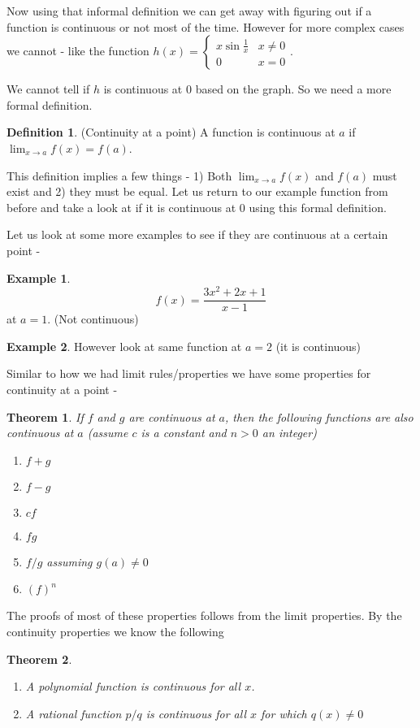 \documentclass[12pt,reqno]{article}
\newtheorem{Theorem}{Theorem}
\theoremstyle{definition}
\newtheorem*{Definition}{Definition}
\newtheorem*{Example}{Example}
\begin{document}
Now using that informal definition we can get away with figuring out if a function is continuous or not most of the time. However for more complex cases we cannot - like the function $h(x) = \begin{cases}
	x \sin \frac{1}{x} & x \neq 0 \\ 0 & x = 0
\end{cases}$. 

We cannot tell if $h$ is continuous at $0$ based on the graph. So we need a more formal definition. 

\begin{Definition}
	(Continuity at a point) A function is continuous at $a$ if $\lim_{x \to a} f(x) = f(a)$. 
\end{Definition}

This definition implies a few things - 1) Both $\lim_{x\to a}f(x)$ and $f(a)$ must exist and 2) they must be equal. Let us return to our example function from before and take a look at if it is continuous at $0$ using this formal definition. 

Let us look at some more examples to see if they are continuous at a certain point - 
\begin{Example}
	$$f(x) = \frac{3x^2 + 2x+ 1}{x - 1}$$ at $a = 1$. (Not continuous)
\end{Example}
\begin{Example}
	However look at same function at $a = 2$ (it is continuous)
\end{Example}

Similar to how we had limit rules/properties we have some properties for continuity at a point - 
\begin{Theorem}
	If $f$ and $g$ are continuous at $a$, then the following functions are also continuous at $a$ (assume $c$ is a constant and $n > 0$ an integer)
	\begin{enumerate}
		\item[a.] $f + g$
		\item[b.] $f - g$
		\item[c.] $c f$ 
		\item[d.] $f g$ 
		\item[e.] $f/g$ assuming $g(a) \neq 0$
		\item[f.] $(f)^n$ 
	\end{enumerate}
\end{Theorem}

The proofs of most of these properties follows from the limit properties. By the continuity properties we know the following
\begin{Theorem}
	\begin{enumerate}
		\item[a.] A polynomial function is continuous for all $x$. 
		\item[b.] A rational function $p/q$ is continuous for all $x$ for which $q(x) \neq 0$
	\end{enumerate}
\end{Theorem}
\end{document}
